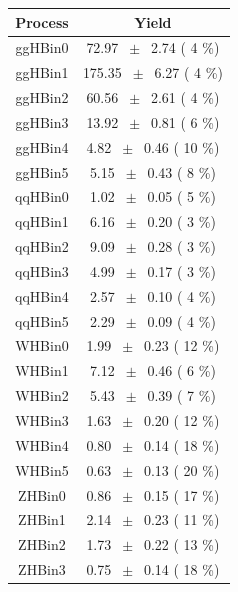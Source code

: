 \begin{table}[h!]\begin{center}
\tiny{
\begin{tabular}{ c  c  } \hline
 Process  &    Yield  \\ \hline \hline
       ggHBin0   &      72.97 $~\pm~$       2.74 (         4 \%)  \\
       ggHBin1   &     175.35 $~\pm~$       6.27 (         4 \%)  \\
       ggHBin2   &      60.56 $~\pm~$       2.61 (         4 \%)  \\
       ggHBin3   &      13.92 $~\pm~$       0.81 (         6 \%)  \\
       ggHBin4   &       4.82 $~\pm~$       0.46 (        10 \%)  \\
       ggHBin5   &       5.15 $~\pm~$       0.43 (         8 \%)  \\
       qqHBin0   &       1.02 $~\pm~$       0.05 (         5 \%)  \\
       qqHBin1   &       6.16 $~\pm~$       0.20 (         3 \%)  \\
       qqHBin2   &       9.09 $~\pm~$       0.28 (         3 \%)  \\
       qqHBin3   &       4.99 $~\pm~$       0.17 (         3 \%)  \\
       qqHBin4   &       2.57 $~\pm~$       0.10 (         4 \%)  \\
       qqHBin5   &       2.29 $~\pm~$       0.09 (         4 \%)  \\
        WHBin0   &       1.99 $~\pm~$       0.23 (        12 \%)  \\
        WHBin1   &       7.12 $~\pm~$       0.46 (         6 \%)  \\
        WHBin2   &       5.43 $~\pm~$       0.39 (         7 \%)  \\
        WHBin3   &       1.63 $~\pm~$       0.20 (        12 \%)  \\
        WHBin4   &       0.80 $~\pm~$       0.14 (        18 \%)  \\
        WHBin5   &       0.63 $~\pm~$       0.13 (        20 \%)  \\
        ZHBin0   &       0.86 $~\pm~$       0.15 (        17 \%)  \\
        ZHBin1   &       2.14 $~\pm~$       0.23 (        11 \%)  \\
        ZHBin2   &       1.73 $~\pm~$       0.22 (        13 \%)  \\
        ZHBin3   &       0.75 $~\pm~$       0.14 (        18 \%)  \\

\end{tabular}}
\end{center}
\end{table}
